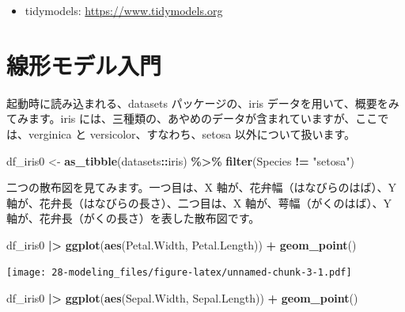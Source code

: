 \documentclass[
  xelatex, ja=standard]{bxjsbook}
\newenvironment{Shaded}{\begin{snugshade}}{\end{snugshade}}
\newcommand{\FunctionTok}[1]{\textcolor[rgb]{0.13,0.29,0.53}{\textbf{#1}}}
\newcommand{\NormalTok}[1]{#1}
\newcommand{\OtherTok}[1]{\textcolor[rgb]{0.56,0.35,0.01}{#1}}
\newcommand{\SpecialCharTok}[1]{\textcolor[rgb]{0.81,0.36,0.00}{\textbf{#1}}}
\newcommand{\StringTok}[1]{\textcolor[rgb]{0.31,0.60,0.02}{#1}}
\providecommand{\tightlist}{%
  \setlength{\itemsep}{0pt}\setlength{\parskip}{0pt}}
\theoremstyle{definition}
\theoremstyle{definition}
\theoremstyle{definition}
\theoremstyle{definition}
\theoremstyle{remark}
\begin{document}
\begin{itemize}
\tightlist
\item
  tidymodels: \url{https://www.tidymodels.org}
\end{itemize}

\hypertarget{ux7ddaux5f62ux30e2ux30c7ux30ebux5165ux9580}{%
\section{線形モデル入門}\label{ux7ddaux5f62ux30e2ux30c7ux30ebux5165ux9580}}

起動時に読み込まれる、datasets パッケージの、iris データを用いて、概要をみてみます。iris には、三種類の、あやめのデータが含まれていますが、ここでは、verginica と versicolor、すなわち、setosa 以外について扱います。

\begin{Shaded}
\begin{Highlighting}[]
\NormalTok{df\_iris0 }\OtherTok{\textless{}{-}} \FunctionTok{as\_tibble}\NormalTok{(datasets}\SpecialCharTok{::}\NormalTok{iris) }\SpecialCharTok{\%\textgreater{}\%} \FunctionTok{filter}\NormalTok{(Species }\SpecialCharTok{!=} \StringTok{"setosa"}\NormalTok{)}
\end{Highlighting}
\end{Shaded}

二つの散布図を見てみます。一つ目は、X 軸が、花弁幅（はなびらのはば）、Y 軸が、花弁長（はなびらの長さ）、二つ目は、X 軸が、萼幅（がくのはば）、Y 軸が、花弁長（がくの長さ）を表した散布図です。

\begin{Shaded}
\begin{Highlighting}[]
\NormalTok{df\_iris0 }\SpecialCharTok{|\textgreater{}} \FunctionTok{ggplot}\NormalTok{(}\FunctionTok{aes}\NormalTok{(Petal.Width, Petal.Length)) }\SpecialCharTok{+} \FunctionTok{geom\_point}\NormalTok{()}
\end{Highlighting}
\end{Shaded}

\texttt{[image: 28-modeling\_files/figure-latex/unnamed-chunk-3-1.pdf]}

\begin{Shaded}
\begin{Highlighting}[]
\NormalTok{df\_iris0 }\SpecialCharTok{|\textgreater{}} \FunctionTok{ggplot}\NormalTok{(}\FunctionTok{aes}\NormalTok{(Sepal.Width, Sepal.Length)) }\SpecialCharTok{+} \FunctionTok{geom\_point}\NormalTok{()}
\end{Highlighting}
\end{Shaded}
\end{document}
